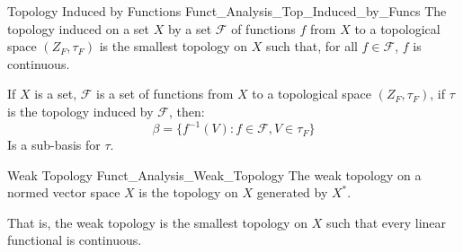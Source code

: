 \documentclass[crop=false,class=book,oneside]{standalone}                      %
\begin{document}
            \begin{ldefinition}{Topology Induced by Functions}
                  {Funct_Analysis_Top_Induced_by_Funcs}
                The topology induced on a set $X$ by a
                set $\mathcal{F}$ of functions $f$ from $X$ to
                a topological space $(Z_{F},\tau_{F})$ is the
                smallest topology on $X$ such that, for all
                $f\in\mathcal{F}$, $f$ is continuous.
            \end{ldefinition}
            \begin{theorem}
                If $X$ is a set, $\mathcal{F}$ is a set of functions
                from $X$ to a topological space $(Z_{F},\tau_{F})$,
                if $\tau$ is the topology induced by $\mathcal{F}$,
                then:
                \begin{equation}
                    \beta=\big\{f^{\minus{1}}(V):
                        f\in\mathcal{F},V\in\tau_{F}\big\}
                \end{equation}
                Is a sub-basis for $\tau$.
            \end{theorem}
            \begin{ldefinition}{Weak Topology}
                  {Funct_Analysis_Weak_Topology}
                The weak topology on a normed vector space
                $X$ is the topology on $X$ generated by 
                $X^{*}$.
            \end{ldefinition}
            That is, the weak topology is the smallest topology on
            $X$ such that every linear functional is continuous.
\end{document}
